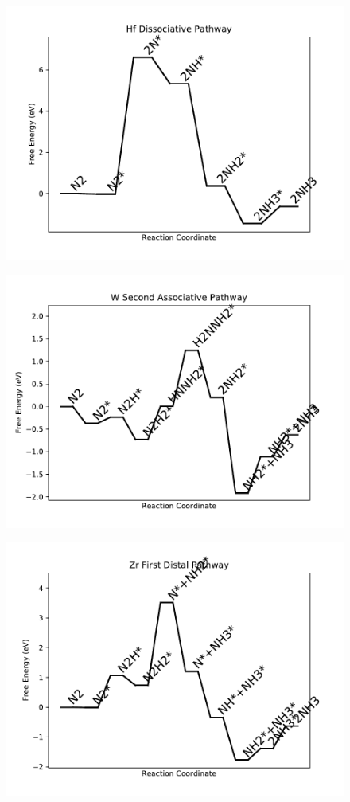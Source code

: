 \begin{figure}
\includegraphics[width=0.8\linewidth]{data/plots/Hf_dissociative.pdf}
\label{fig:Hf_dissociative}
\end{figure}

\begin{figure}
\includegraphics[width=0.8\linewidth]{data/plots/W_associative_2.pdf}
\label{fig:W_associative_2}
\end{figure}

\begin{figure}
\includegraphics[width=0.8\linewidth]{data/plots/Zr_distal_1.pdf}
\label{fig:Zr_distal_1}
\end{figure}

